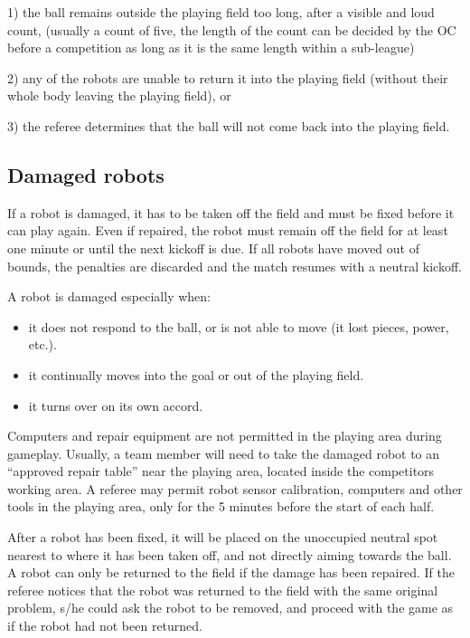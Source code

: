 \documentclass{article}
\begin{document}
1) the ball remains outside the playing field too long, \textcolor{color-5}{after a visible and loud count, (usually a count of five, the length of the count can be decided by the OC before a competition as long as it is the same length within a sub-league)}

2) any of the robots are unable to return it into the playing field (without their whole body leaving the playing field), or 

3) the referee determines that the ball will not come back into the playing field.

\subsection{Damaged robots \label{ref-012}}

If a robot is damaged, it has to be taken off the field and must be fixed before it can play again. Even if repaired, the robot must remain off the field for at least one minute or until the next kickoff is due. If all robots have moved out of bounds, the penalties are discarded and the match resumes with a neutral kickoff. 

A robot is damaged especially when: 

\begin{itemize}
\item it does not respond to the ball, or is not able to move (it lost pieces, power, etc.). 

\item it continually moves into the goal or out of the playing field. 

\item it turns over on its own accord. 

\end{itemize}

Computers and repair equipment are not permitted in the playing area during gameplay. Usually, a team member will need to take the damaged robot to an ``approved repair table'' near the playing area, located inside the competitors working area. A referee may permit robot sensor calibration, computers and other tools in the playing area, only for the 5 minutes before the start of each half. 

After a robot has been fixed, it will be placed on the unoccupied neutral spot nearest to where it has been taken off, and not directly aiming towards the ball. A robot can only be returned to the field if the damage has been repaired. If the referee notices that the robot was returned to the field with the same original problem, s/he could ask the robot to be removed, and proceed with the game as if the robot had not been returned. 
\end{document}
